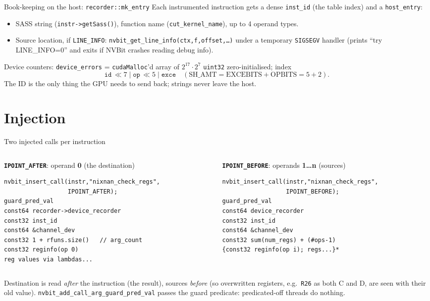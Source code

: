 \documentclass[aspectratio=169,10pt]{beamer}
\begin{document}
\begin{frame}{Book-keeping on the host: \texttt{recorder::mk\_entry}}
\small
Each instrumented instruction gets a dense \texttt{inst\_id} (the table index) and a \texttt{host\_entry}:
\begin{itemize}
\item SASS string (\texttt{instr->getSass()}), function name (\texttt{cut\_kernel\_name}), up to 4 operand types.
\item Source location, if \texttt{LINE\_INFO}: \texttt{nvbit\_get\_line\_info(ctx,f,offset,\dots)} under a temporary \texttt{SIGSEGV} handler (prints ``try LINE\_INFO=0'' and exits if NVBit crashes reading debug info).
\end{itemize}
Device counters: \texttt{device\_errors} = \texttt{cudaMalloc}'d array of $2^{17}\!\cdot\!2^{7}$ \texttt{uint32} zero-initialised; index
\[ \texttt{id}\,\ll 7 \;|\; \texttt{op}\,\ll 5 \;|\; \texttt{exce}\quad(\text{SH\_AMT}=\text{EXCEBITS}+\text{OPBITS}=5+2). \]
The ID is the only thing the GPU needs to send back; strings never leave the host.
\end{frame}

\section{Injection}
\begin{frame}[fragile]{Two injected calls per instruction}
\begin{columns}\begin{column}{0.5\textwidth}\small
\textbf{\texttt{IPOINT\_AFTER}}: operand \textbf{0} (the destination)
\begin{lstlisting}
nvbit_insert_call(instr,"nixnan_check_regs",
                  IPOINT_AFTER);
guard_pred_val
const64 recorder->device_recorder
const32 inst_id
const64 &channel_dev
const32 1 + rfuns.size()   // arg_count
const32 reginfo(op 0)
reg values via lambdas...
\end{lstlisting}
\end{column}\begin{column}{0.5\textwidth}\small
\textbf{\texttt{IPOINT\_BEFORE}}: operands \textbf{1\dots n} (sources)
\begin{lstlisting}
nvbit_insert_call(instr,"nixnan_check_regs",
                  IPOINT_BEFORE);
guard_pred_val
const64 device_recorder
const32 inst_id
const64 &channel_dev
const32 sum(num_regs) + (#ops-1)
{const32 reginfo(op i); regs...}*
\end{lstlisting}
\end{column}\end{columns}
\smallskip\small Destination is read \emph{after} the instruction (the result), sources \emph{before} (so overwritten registers, e.g.\ \texttt{R26} as both C and D, are seen with their old value).
\texttt{nvbit\_add\_call\_arg\_guard\_pred\_val} passes the guard predicate: predicated-off threads do nothing.
\end{frame}
\end{document}

